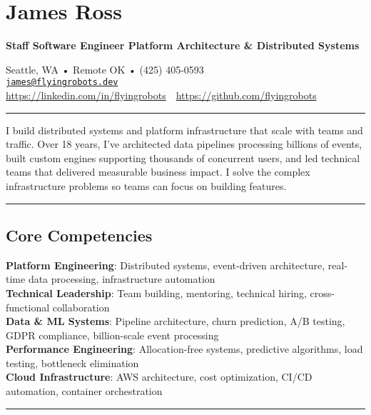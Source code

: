 \documentclass[
]{article}
\author{}
\date{}
\begin{document}
\section{James Ross}\label{james-ross}

\textbf{Staff Software Engineer \textbar{} Platform Architecture \&
Distributed Systems}

Seattle, WA • Remote OK • (425) 405-0593‬\\
\href{mailto:james@flyingrobots.dev}{\nolinkurl{james@flyingrobots.dev}}\\
\url{https://linkedin.com/in/flyingrobots}~\textbar~\url{https://github.com/flyingrobots}

\begin{center}\rule{0.5\linewidth}{0.5pt}\end{center}

I build distributed systems and platform infrastructure that scale with
teams and traffic. Over 18 years, I've architected data pipelines
processing billions of events, built custom engines supporting thousands
of concurrent users, and led technical teams that delivered measurable
business impact. I solve the complex infrastructure problems so teams
can focus on building features.

\begin{center}\rule{0.5\linewidth}{0.5pt}\end{center}

\subsection{Core Competencies}\label{core-competencies}

\textbf{Platform Engineering}: Distributed systems, event-driven
architecture, real-time data processing, infrastructure automation\\
\textbf{Technical Leadership}: Team building, mentoring, technical
hiring, cross-functional collaboration\\
\textbf{Data \& ML Systems}: Pipeline architecture, churn prediction,
A/B testing, GDPR compliance, billion-scale event processing\\
\textbf{Performance Engineering}: Allocation-free systems, predictive
algorithms, load testing, bottleneck elimination\\
\textbf{Cloud Infrastructure}: AWS architecture, cost optimization,
CI/CD automation, container orchestration

\begin{center}\rule{0.5\linewidth}{0.5pt}\end{center}
\end{document}
